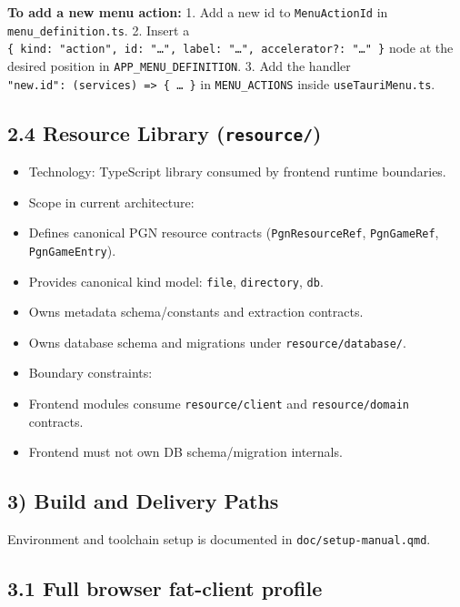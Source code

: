 \documentclass[]{article}
\providecommand{\tightlist}{%
  \setlength{\itemsep}{0pt}\setlength{\parskip}{0pt}}
\begin{document}
\textbf{To add a new menu action:} 1. Add a new id to
\texttt{MenuActionId} in \texttt{menu\_definition.ts}. 2. Insert a
\texttt{\{\ kind:\ "action",\ id:\ "\ldots{}",\ label:\ "\ldots{}",\ accelerator?:\ "\ldots{}"\ \}}
node at the desired position in \texttt{APP\_MENU\_DEFINITION}. 3. Add
the handler
\texttt{"new.id":\ (services)\ =\textgreater{}\ \{\ \ldots{}\ \}} in
\texttt{MENU\_ACTIONS} inside \texttt{useTauriMenu.ts}.

\subsection{\texorpdfstring{2.4 Resource Library
(\texttt{resource/})}{2.4 Resource Library (resource/)}}\label{resource-library-resource}

\begin{itemize}
\tightlist
\item
  Technology: TypeScript library consumed by frontend runtime
  boundaries.
\item
  Scope in current architecture:
\item
  Defines canonical PGN resource contracts (\texttt{PgnResourceRef},
  \texttt{PgnGameRef}, \texttt{PgnGameEntry}).
\item
  Provides canonical kind model: \texttt{file}, \texttt{directory},
  \texttt{db}.
\item
  Owns metadata schema/constants and extraction contracts.
\item
  Owns database schema and migrations under \texttt{resource/database/}.
\item
  Boundary constraints:
\item
  Frontend modules consume \texttt{resource/client} and
  \texttt{resource/domain} contracts.
\item
  Frontend must not own DB schema/migration internals.
\end{itemize}

\subsection{3) Build and Delivery Paths}\label{build-and-delivery-paths}

Environment and toolchain setup is documented in
\texttt{doc/setup-manual.qmd}.

\subsection{3.1 Full browser fat-client
profile}\label{full-browser-fat-client-profile}
\end{document}
